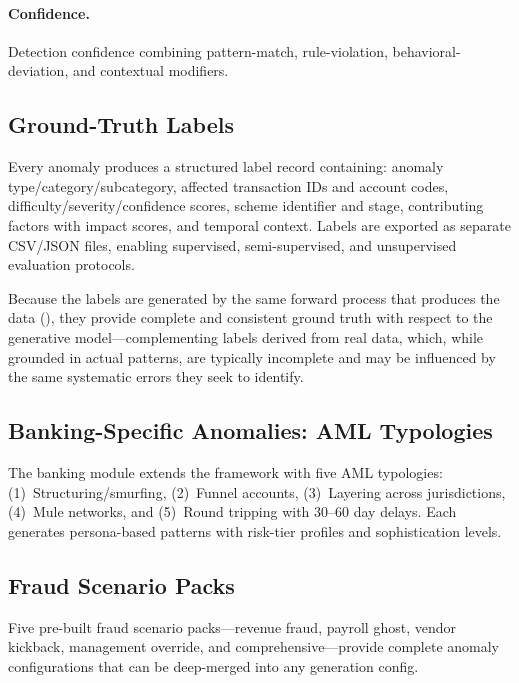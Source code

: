 \paragraph{Confidence.}
Detection confidence combining pattern-match, rule-violation,
behavioral-deviation, and contextual modifiers.

\subsection{Ground-Truth Labels}
\label{sec:anom_labels}

Every anomaly produces a structured label record containing:
anomaly type/category/subcategory, affected transaction IDs and account
codes, difficulty/severity/confidence scores, scheme identifier and
stage, contributing factors with impact scores, and temporal context.
Labels are exported as separate CSV/JSON files, enabling supervised,
semi-supervised, and unsupervised evaluation protocols.

Because the labels are generated by the same forward process that
produces the data (), they provide
complete and consistent ground truth with respect to
the generative model---complementing labels derived from real data,
which, while grounded in actual patterns, are typically incomplete
and may be influenced by the same systematic errors they seek to
identify.

\subsection{Banking-Specific Anomalies: AML Typologies}
\label{sec:anom_aml}

The banking module extends the framework with five AML typologies:
(1)~Structuring/smurfing, (2)~Funnel accounts, (3)~Layering across
jurisdictions, (4)~Mule networks, and (5)~Round tripping with 30--60
day delays.  Each generates persona-based patterns with risk-tier
profiles and sophistication levels.

\subsection{Fraud Scenario Packs}
\label{sec:anom_fraud_packs}

Five pre-built fraud scenario packs---revenue fraud, payroll ghost,
vendor kickback, management override, and comprehensive---provide
complete anomaly configurations that can be deep-merged into any
generation config.
